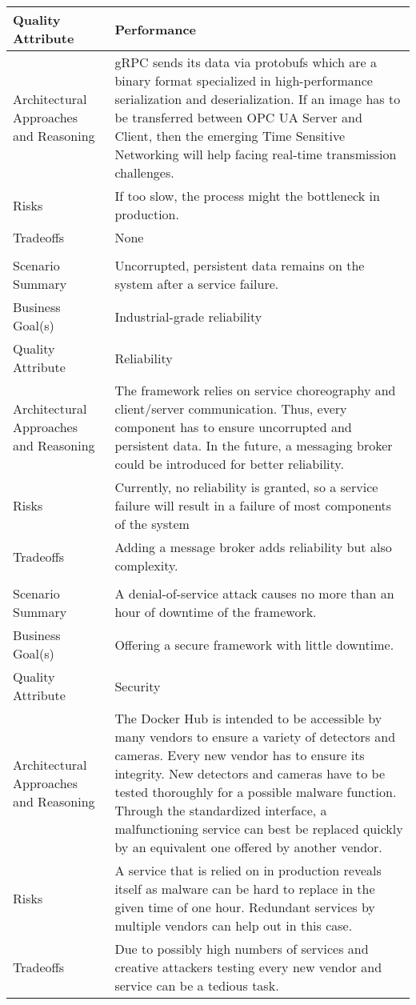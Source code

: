 {\begin{longtable}{| P{0.2\textwidth} | P{0.74\textwidth} |}
Quality Attribute & Performance\\ \hline
Architectural Approaches and Reasoning &  gRPC sends its data via protobufs which are a binary format specialized in high-performance serialization and deserialization. If an image has to be transferred between OPC UA Server and Client, then the emerging Time Sensitive Networking will help facing real-time transmission challenges.\\ \hline
Risks & If too slow, the process might the bottleneck in production.\\ \hline
Tradeoffs &  None\\ \hline
{}
 \\ \hline
Scenario Summary & Uncorrupted, persistent data remains on the system after a service failure.\\ \hline
Business Goal(s) & Industrial-grade reliability \\ \hline
Quality Attribute & Reliability\\ \hline
Architectural Approaches and Reasoning & The framework relies on service choreography and client/server communication. Thus, every component has to ensure uncorrupted and persistent data. In the future, a messaging broker could be introduced for better reliability.\\ \hline
Risks & Currently, no reliability is granted, so a service failure will result in a failure of most components of the system \\ \hline
Tradeoffs & Adding a message broker adds reliability but also complexity. \\ \hline
{}
 \\ \hline
Scenario Summary & A denial-of-service attack causes no more than an hour of downtime of the framework.\\ \hline
Business Goal(s) & Offering a secure framework with little downtime. \\ \hline
Quality Attribute & Security\\ \hline
Architectural Approaches and Reasoning & The Docker Hub is intended to be accessible by many vendors to ensure a variety of detectors and cameras. Every new vendor has to ensure its integrity. New detectors and cameras have to be tested thoroughly for a possible malware function. Through the standardized interface, a malfunctioning service can best be replaced quickly by an equivalent one offered by another vendor.\\ \hline
Risks &  A service that is relied on in production reveals itself as malware can be hard to replace in the given time of one hour. Redundant services by multiple vendors can help out in this case.\\ \hline
Tradeoffs & Due to possibly high numbers of services and creative attackers testing every new vendor and service can be a tedious task.\\ \hline
\end{longtable}
}
